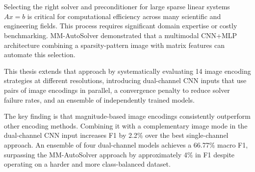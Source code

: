 \chapter{\abstractname}

Selecting the right solver and preconditioner for large sparse linear systems $Ax=b$ is critical for computational efficiency across many scientific and engineering fields.
This process requires significant domain expertise or costly benchmarking.
MM-AutoSolver demonstrated that a multimodal CNN+MLP architecture combining a sparsity-pattern image with matrix features can automate this selection.

This thesis extends that approach by systematically evaluating 14 image encoding strategies at different resolutions, introducing dual-channel CNN inputs that use pairs of image encodings in parallel, a convergence penalty to reduce solver failure rates, and an ensemble of independently trained models.

The key finding is that magnitude-based image encodings consistently outperform other encoding methods.
Combining it with a complementary image mode in the dual-channel CNN input increases F1 by 2.2\% over the best single-channel approach.
An ensemble of four dual-channel models achieves a 66.77\% macro F1, surpassing the MM-AutoSolver approach by approximately 4\% in F1 despite operating on a harder and more class-balanced dataset.

